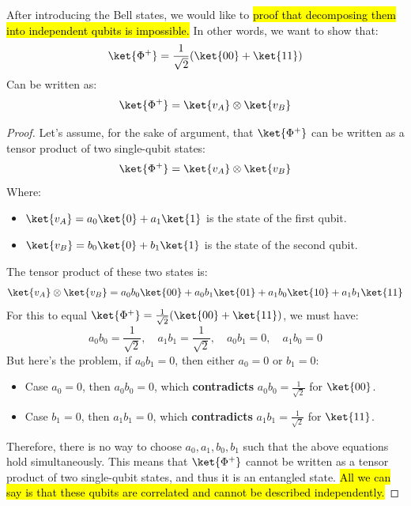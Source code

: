 \begin{examplebox}
    After introducing the Bell states, we would like to \hl{proof that decomposing them into independent qubits is impossible.} In other words, we want to show that:
    \begin{equation*}
        \ket{\Phi^+} = \frac{1}{\sqrt{2}}(\ket{00} + \ket{11})
    \end{equation*}
    Can be written as:
    \begin{equation*}
        \ket{\Phi^+} = \ket{v_A} \otimes \ket{v_B}
    \end{equation*}
    \begin{proof}
        Let's assume, for the sake of argument, that $\ket{\Phi^+}$ can be written as a tensor product of two single-qubit states:
        \begin{equation*}
            \ket{\Phi^+} = \ket{v_A} \otimes \ket{v_B}
        \end{equation*}
        Where:
        \begin{itemize}
            \item $\ket{v_A} = a_0 \ket{0} + a_1 \ket{1}$ is the state of the first qubit.
            \item $\ket{v_B} = b_0 \ket{0} + b_1 \ket{1}$ is the state of the second qubit.
        \end{itemize}
        The tensor product of these two states is:
        \begin{equation*}
            \ket{v_A} \otimes \ket{v_B} = a_0 b_0 \ket{00} + a_0 b_1 \ket{01} + a_1 b_0 \ket{10} + a_1 b_1 \ket{11}
        \end{equation*}
        For this to equal $\ket{\Phi^+} = \frac{1}{\sqrt{2}}(\ket{00} + \ket{11})$, we must have:
        \begin{equation*}
            a_0 b_0 = \frac{1}{\sqrt{2}}, \quad a_1 b_1 = \frac{1}{\sqrt{2}}, \quad a_0 b_1 = 0, \quad a_1 b_0 = 0
        \end{equation*}
        But here's the problem, if $a_0 b_1 = 0$, then either $a_0 = 0$ or $b_1 = 0$:
        \begin{itemize}
            \item[\textcolor{Red2}{\faIcon{times}}] Case $a_0 = 0$, then $a_0b_0 = 0$, which \textbf{contradicts} $a_0 b_0 = \frac{1}{\sqrt{2}}$ for $\ket{00}$.
            \item[\textcolor{Red2}{\faIcon{times}}] Case $b_1 = 0$, then $a_1 b_1 = 0$, which \textbf{contradicts} $a_1 b_1 = \frac{1}{\sqrt{2}}$ for $\ket{11}$.
        \end{itemize}
        Therefore, there is no way to choose $a_0, a_1, b_0, b_1$ such that the above equations hold simultaneously. This means that $\ket{\Phi^+}$ cannot be written as a tensor product of two single-qubit states, and thus it is an entangled state. \hl{All we can say is that these qubits are correlated and cannot be described independently.}
    \end{proof}
\end{examplebox}

